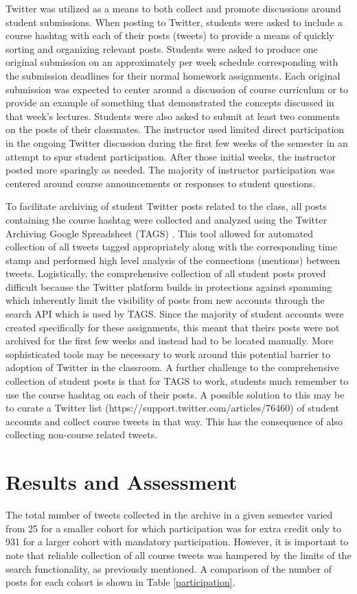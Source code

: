\documentclass[12pt]{article}
\begin{document}
Twitter was utilized as a means to both collect and promote discussions around student submissions. When posting to Twitter, students were asked to include a course hashtag with each of their posts (tweets) to provide a means of quickly sorting and organizing relevant posts. Students were asked to produce one original submission on an approximately per week schedule corresponding with the submission deadlines for their normal homework assignments. Each original submission was expected to center around a discussion of course curriculum or to provide an example of something that demonstrated the concepts discussed in that week's lectures. Students were also asked to submit at least two comments on the posts of their classmates. The instructor used limited direct participation in the ongoing Twitter discussion during the first few weeks of the semester in an attempt to spur student participation. After those initial weeks, the instructor posted more sparingly as needed. The majority of instructor participation was centered around course announcements or responses to student questions.

To facilitate archiving of student Twitter posts related to the class, all posts containing the course hashtag were collected and analyzed using the Twitter Archiving Google Spreadsheet (TAGS) \cite{hawksey_twitter_2014}. This tool allowed for automated collection of all tweets tagged appropriately along with the corresponding time stamp and performed high level analysis of the connections (mentions) between tweets. Logistically, the comprehensive collection of all student posts proved difficult because the Twitter platform builds in protections against spamming which inherently limit the visibility of posts from new accounts through the search API which is used by TAGS. Since the majority of student accounts were created specifically for these assignments, this meant that theirs posts were not archived for the first few weeks and instead had to be located manually. More sophisticated tools may be necessary to work around this potential barrier to adoption of Twitter in the classroom. A further challenge to the comprehensive collection of student posts is that for TAGS to work, students much remember to use the course hashtag on each of their posts. A possible solution to this may be to curate a Twitter list (https://support.twitter.com/articles/76460) of student accounts and collect course tweets in that way. This has the consequence of also collecting non-course related tweets.

\section*{Results and Assessment}
The total number of tweets collected in the archive in a given semester varied from 25 for a smaller cohort for which participation was for extra credit only to 931 for a larger cohort with mandatory participation. However, it is important to note that reliable collection of all course tweets was hampered by the limits of the search functionality, as previously mentioned. A comparison of the number of posts for each cohort is shown in Table \ref{participation}.
\end{document}
